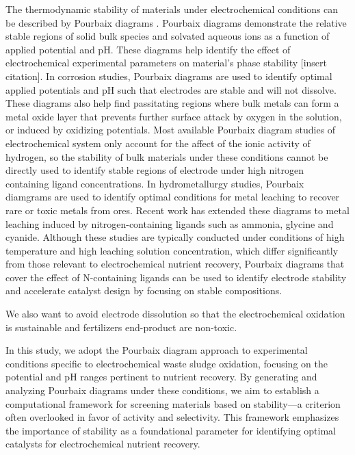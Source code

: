 \documentclass[journal=jacsat,manuscript=article]{achemso}
\begin{document}

The thermodynamic stability of materials under electrochemical conditions can be described by Pourbaix diagrams \cite{PourbaixAtlasSolutions}. Pourbaix diagrams demonstrate the relative stable regions of solid bulk species and solvated aqueous ions as a function of applied potential and pH. These diagrams help identify the effect of electrochemical experimental parameters on material's phase stability [insert citation]. In corrosion studies, Pourbaix diagrams are used to identify optimal applied potentials and pH such that electrodes are stable and will not dissolve. These diagrams also help find passitating regions where bulk metals can form a metal oxide layer that prevents further surface attack by oxygen in the solution, or induced by oxidizing potentials. Most available Pourbaix diagram studies of electrochemical system only account for the affect of the ionic activity of hydrogen, so the stability of bulk materials under these conditions cannot be directly used to identify stable regions of electrode under high nitrogen containing ligand concentrations. In hydrometallurgy studies, Pourbaix diamgrams are used to identify optimal conditions for metal leaching to recover rare or toxic metals from ores. Recent work has extended these diagrams to metal leaching induced by nitrogen-containing ligands such as ammonia\cite{Meng1996PrinciplesReview}, glycine and cyanide. Although these studies are typically conducted under conditions of high temperature and high leaching solution concentration, which differ significantly from those relevant to electrochemical nutrient recovery, Pourbaix diagrams that cover the effect of N-containing ligands can be used to identify electrode stability and accelerate catalyst design by focusing on stable compositions. 

We also want to avoid electrode dissolution so that the electrochemical oxidation is sustainable and fertilizers end-product are non-toxic. 

In this study, we adopt the Pourbaix diagram approach to experimental conditions specific to electrochemical waste sludge oxidation, focusing on the potential and pH ranges pertinent to nutrient recovery. By generating and analyzing Pourbaix diagrams under these conditions, we aim to establish a computational framework for screening materials based on stability—a criterion often overlooked in favor of activity and selectivity. This framework emphasizes the importance of stability as a foundational parameter for identifying optimal catalysts for electrochemical nutrient recovery.
\end{document}
